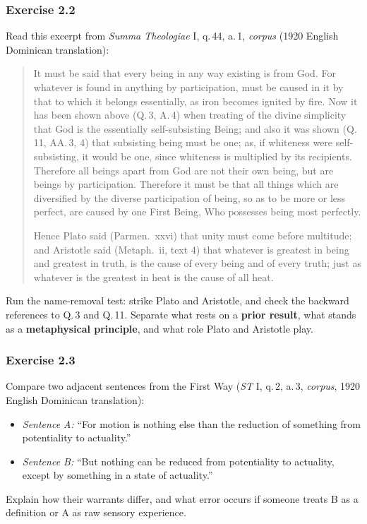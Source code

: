 \subsubsection*{Exercise 2.2}
Read this excerpt from \emph{Summa Theologiae} I, q.\,44, a.\,1, \emph{corpus} (1920 English Dominican translation):

\begin{quote}
It must be said that every being in any way existing is from God. For whatever is found in anything by participation, must be caused in it by that to which it belongs essentially, as iron becomes ignited by fire. Now it has been shown above (Q.\,3, A.\,4) when treating of the divine simplicity that God is the essentially self-subsisting Being; and also it was shown (Q.\,11, AA.\,3, 4) that subsisting being must be one; as, if whiteness were self-subsisting, it would be one, since whiteness is multiplied by its recipients. Therefore all beings apart from God are not their own being, but are beings by participation. Therefore it must be that all things which are diversified by the diverse participation of being, so as to be more or less perfect, are caused by one First Being, Who possesses being most perfectly.

Hence Plato said (Parmen.\ xxvi) that unity must come before multitude; and Aristotle said (Metaph.\ ii, text 4) that whatever is greatest in being and greatest in truth, is the cause of every being and of every truth; just as whatever is the greatest in heat is the cause of all heat.
\end{quote}

Run the name-removal test: strike Plato and Aristotle, and check the backward references to Q.\,3 and Q.\,11. Separate what rests on a \textbf{prior result}, what stands as a \textbf{metaphysical principle}, and what role Plato and Aristotle play.

\subsubsection*{Exercise 2.3}
Compare two adjacent sentences from the First Way (\emph{ST} I, q.\,2, a.\,3, \emph{corpus}, 1920 English Dominican translation):
\begin{itemize}
\item \emph{Sentence A:} ``For motion is nothing else than the reduction of something from potentiality to actuality.''
\item \emph{Sentence B:} ``But nothing can be reduced from potentiality to actuality, except by something in a state of actuality.''
\end{itemize}
Explain how their warrants differ, and what error occurs if someone treats B as a definition or A as raw sensory experience.

